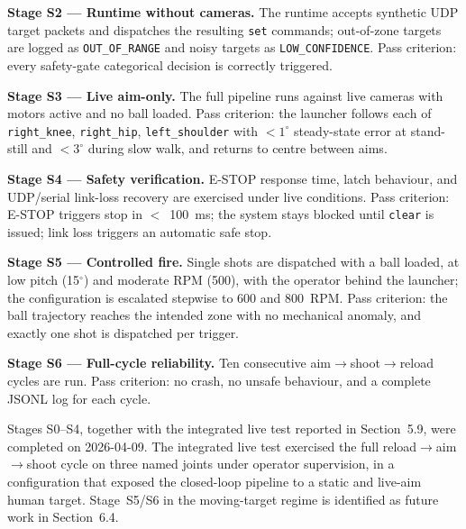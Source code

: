 \textbf{Stage S2 --- Runtime without cameras.} The runtime accepts synthetic UDP target packets and dispatches the resulting \texttt{set} commands; out-of-zone targets are logged as \texttt{OUT\_OF\_RANGE} and noisy targets as \texttt{LOW\_CONFIDENCE}. Pass criterion: every safety-gate categorical decision is correctly triggered.

\textbf{Stage S3 --- Live aim-only.} The full pipeline runs against live cameras with motors active and no ball loaded. Pass criterion: the launcher follows each of \texttt{right\_knee}, \texttt{right\_hip}, \texttt{left\_shoulder} with $<1^\circ$ steady-state error at stand-still and $<3^\circ$ during slow walk, and returns to centre between aims.

\textbf{Stage S4 --- Safety verification.} E-STOP response time, latch behaviour, and UDP/serial link-loss recovery are exercised under live conditions. Pass criterion: E-STOP triggers stop in $<$~100~ms; the system stays blocked until \texttt{clear} is issued; link loss triggers an automatic safe stop.

\textbf{Stage S5 --- Controlled fire.} Single shots are dispatched with a ball loaded, at low pitch (15$^\circ$) and moderate RPM (500), with the operator behind the launcher; the configuration is escalated stepwise to 600 and 800~RPM. Pass criterion: the ball trajectory reaches the intended zone with no mechanical anomaly, and exactly one shot is dispatched per trigger.

\textbf{Stage S6 --- Full-cycle reliability.} Ten consecutive aim$\to$shoot$\to$reload cycles are run. Pass criterion: no crash, no unsafe behaviour, and a complete JSONL log for each cycle.

Stages S0--S4, together with the integrated live test reported in Section~5.9, were completed on 2026-04-09. The integrated live test exercised the full reload$\to$aim$\to$shoot cycle on three named joints under operator supervision, in a configuration that exposed the closed-loop pipeline to a static and live-aim human target. Stage~S5/S6 in the moving-target regime is identified as future work in Section~6.4.
